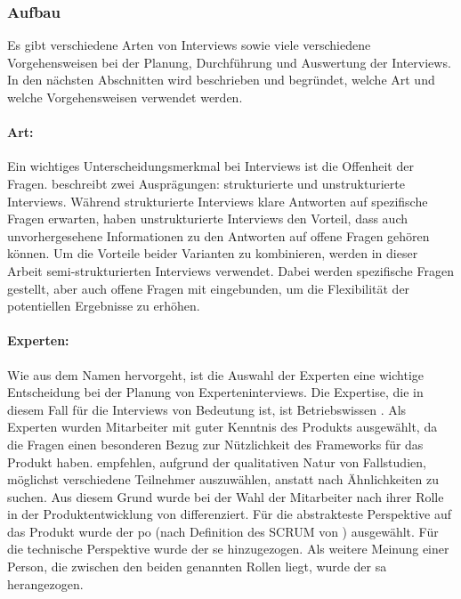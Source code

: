 \subsubsection{Aufbau}
Es gibt verschiedene Arten von Interviews sowie viele verschiedene Vorgehensweisen bei der Planung, Durchführung und Auswertung der Interviews.
In den nächsten Abschnitten wird beschrieben und begründet, welche Art und welche Vorgehensweisen verwendet werden.

\paragraph{Art:} Ein wichtiges Unterscheidungsmerkmal bei Interviews ist die Offenheit der Fragen.
 beschreibt zwei Ausprägungen: strukturierte und unstrukturierte Interviews.
Während struk\-tu\-rier\-te Interviews klare Antworten auf spezifische Fragen erwarten, haben unstrukturierte Interviews den Vorteil, dass auch unvorhergesehene Informationen zu den Antworten auf offene Fragen gehören können.
Um die Vorteile beider Varianten zu kombinieren, werden in dieser Arbeit semi-strukturierten Interviews \cite{seaman2008qualitative} verwendet.
Dabei werden spezifische Fragen gestellt, aber auch offene Fragen mit eingebunden, um die Flexibilität der potentiellen Ergebnisse zu erhöhen.

\paragraph{Experten:} Wie aus dem Namen hervorgeht, ist die Auswahl der Experten eine wichtige Entscheidung bei der Planung von Experteninterviews.
Die Expertise, die in diesem Fall für die Interviews von Bedeutung ist, ist \glqq Betriebswissen\grqq{} \cite{Meuser2009}.
Als Experten wurden Mitarbeiter mit guter Kenntnis des Produkts \jf ausgewählt, da die Fragen einen besonderen Bezug zur Nützlichkeit des Frameworks für das Produkt haben.
 empfehlen, aufgrund der qualitativen Natur von Fallstudien, möglichst verschiedene Teilnehmer auszuwählen, anstatt nach Ähnlichkeiten zu suchen.
Aus diesem Grund wurde bei der Wahl der Mitarbeiter nach ihrer Rolle in der Produktentwicklung von \jf differenziert.
Für die abstrakteste Perspektive auf das Produkt wurde der \acrlong{po} (nach Definition des SCRUM von ) ausgewählt.
Für die technische Perspektive wurde der \gls{se} hinzugezogen.
Als weitere Meinung einer Person, die zwischen den beiden genannten Rollen liegt, wurde der \gls{sa} herangezogen.

